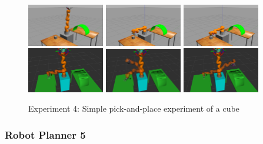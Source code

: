 \begin{center}
\begin{figure}[H]
\centering
\includegraphics[width=0.3\textwidth]{images/robot_planner4/robot_planner4_1}
\includegraphics[width=0.3\textwidth]{images/robot_planner4/robot_planner4_3}
\includegraphics[width=0.3\textwidth]{images/robot_planner4/robot_planner4_5}\\
\includegraphics[width=0.3\textwidth]{images/robot_planner4/robot_planner4_6}
\includegraphics[width=0.3\textwidth]{images/robot_planner4/robot_planner4_8}
\includegraphics[width=0.3\textwidth]{images/robot_planner4/robot_planner4_10}\\
\caption{Experiment 4: Simple pick-and-place experiment of a cube}
\end{figure}
\end{center}

\subsubsection{Robot Planner 5}

